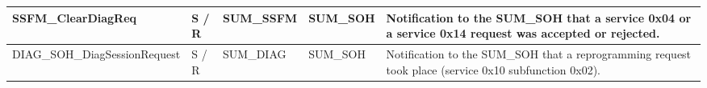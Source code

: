 \begin{longtable}{|l|l|l|l|l|}
\begin{minipage}{0.39\linewidth}\raggedright\vspace{.75ex}SSFM\_ClearDiagReq\vspace{.75ex}\end{minipage} & \begin{minipage}{0.07\linewidth}\raggedright\vspace{.75ex}S / R\vspace{.75ex}\end{minipage} & \begin{minipage}{0.11\linewidth}\raggedright\vspace{.75ex}SUM\_SSFM\vspace{.75ex}\end{minipage} & \begin{minipage}{0.11\linewidth}\raggedright\vspace{.75ex}SUM\_SOH\vspace{.75ex}\end{minipage} & \begin{minipage}{0.16\linewidth}\raggedright\vspace{.75ex}Notification to the SUM\_SOH that a service 0x04 or a service 0x14 request was accepted or rejected.\vspace{.75ex}\end{minipage}\\\hline
\begin{minipage}{0.39\linewidth}\raggedright\vspace{.75ex}DIAG\_SOH\_DiagSessionRequest\vspace{.75ex}\end{minipage} & \begin{minipage}{0.07\linewidth}\raggedright\vspace{.75ex}S / R\vspace{.75ex}\end{minipage} & \begin{minipage}{0.11\linewidth}\raggedright\vspace{.75ex}SUM\_DIAG\vspace{.75ex}\end{minipage} & \begin{minipage}{0.11\linewidth}\raggedright\vspace{.75ex}SUM\_SOH\vspace{.75ex}\end{minipage} & \begin{minipage}{0.16\linewidth}\raggedright\vspace{.75ex}Notification to the SUM\_SOH that a reprogramming request took place (service 0x10 subfunction 0x02).\vspace{.75ex}\end{minipage}\\\hline

\end{longtable}

